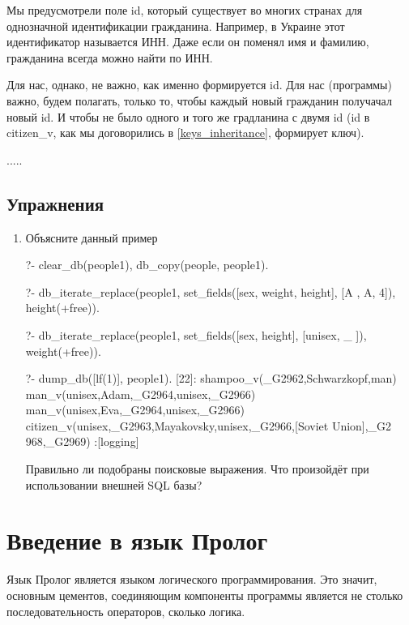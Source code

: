 \documentclass[a4paper]{book}
\begin{document}
Мы предусмотрели поле id, который существует во многих странах
для однозначной идентификации гражданина. Например, в Украине
этот идентификатор называется ИНН. Даже если он поменял имя и
фамилию, гражданина всегда можно найти по ИНН.

Для нас, однако, не важно, как именно формируется id. Для нас
(программы) важно, будем полагать, только то, чтобы каждый новый
гражданин получачал новый id. И чтобы не было одного и того же
градланина с двумя id (id в citizen_v, как мы договорились в
\ref{keys_inheritance}, формирует ключ).

.....

\section{Упражнения}

\begin{enumerate}
\item Объясните данный пример

\begin{example}{}{}
?- clear_db(people1), db_copy(people, people1).

?- db_iterate_replace(people1, set_fields([sex, weight, height], [A
, A, 4]), height(+free)).                                         

?- db_iterate_replace(people1, set_fields([sex, height], [unisex, _
]), weight(+free)).                                               

?- dump_db([lf(1)], people1).
[22]: shampoo_v(_G2962,Schwarzkopf,man) 
man_v(unisex,Adam,_G2964,unisex,_G2966) 
man_v(unisex,Eva,_G2964,unisex,_G2966) 
citizen_v(unisex,_G2963,Mayakovsky,unisex,_G2966,[Soviet Union],_G2
968,_G2969)                                                       
 :[logging]
\end{example}

Правильно ли подобраны поисковые выражения. Что произойдёт при
использовании внешней SQL базы?

\end{enumerate}

\appendix
\chapter{Введение в язык Пролог}

Язык Пролог является языком логического программирования. Это
значит, основным цементов, соединяющим компоненты программы
является не столько последовательность операторов, сколько
логика. 
\end{document}
